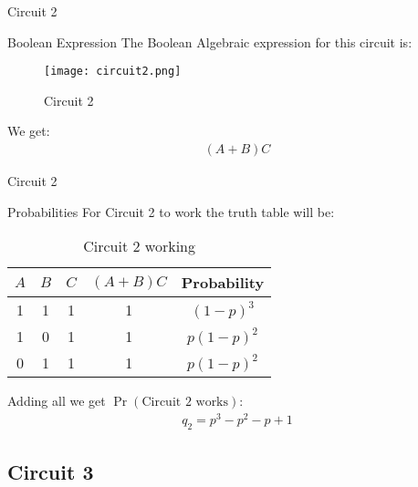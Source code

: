 \documentclass{beamer}
\providecommand{\pr}[1]{\ensuremath{\Pr\left(#1\right)}}
\begin{document}
\begin{frame}{Circuit 2}
\begin{block}{Boolean Expression}
    The Boolean Algebraic expression for this circuit is:
    \begin{figure}
        \centering
        \texttt{[image: circuit2.png]}
        \caption{Circuit 2}
        \label{cir2_label}
    \end{figure}
    We get:
    \begin{align}
        (A+B)C
    \end{align}
\end{block}
\end{frame}
\begin{frame}{Circuit 2}
\begin{block}{Probabilities}
    For Circuit 2 to work the truth table will be:
    \begin{table}[h]
    \centering
    \begin{tabular}{|c|c|c|c|c|}
    \hline
         $A$ & $B$ & $C$ & $(A+B)C$& Probability\\
         \hline
         1&1&1&1 &$(1-p)^3$\\ \hline
         1&0&1&1& $p(1-p)^2$\\\hline
         0&1&1&1& $p(1-p)^2$\\
    \hline
    \end{tabular}
    \caption{Circuit 2 working}
    \label{tab:table2}
\end{table}
    Adding all we get $\pr{\text{Circuit 2 works}}$:
    \begin{align}
    q_2 = p^3-p^2-p+1 \label{q_2_label}
\end{align}
\end{block}
\end{frame}

\subsection{Circuit 3}
\end{document}

